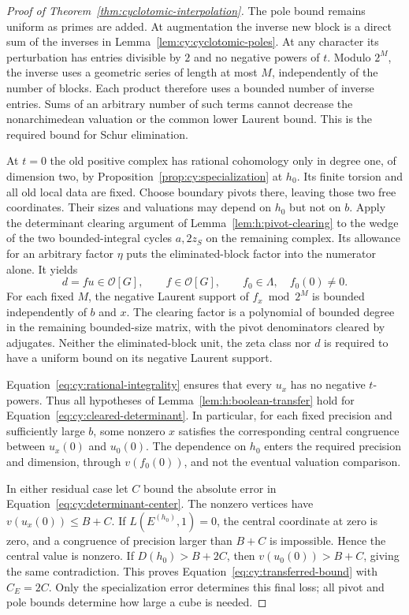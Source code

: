 \begin{proof}[Proof of Theorem~\ref{thm:cyclotomic-interpolation}]
The pole bound remains uniform as primes are added.  At augmentation the inverse new block is a direct
sum of the inverses in Lemma~\ref{lem:cy:cyclotomic-poles}.  At any
character its perturbation has entries divisible by $2$ and no
negative powers of $t$.  Modulo $2^M$, the inverse uses a geometric
series of length at most $M$, independently of the number of blocks.
Each product therefore uses a bounded number of inverse entries.
Sums of an arbitrary number of such terms cannot decrease the
nonarchimedean valuation or the common lower Laurent bound.  This is
the required bound for Schur elimination.

At $t=0$ the old positive complex has rational cohomology only in
degree one, of dimension two, by
Proposition~\ref{prop:cy:specialization} at $h_0$.  Its finite torsion
and all old local data are fixed.  Choose boundary pivots there,
leaving those two free coordinates.  Their sizes and valuations may
depend on $h_0$ but not on $b$.  Apply the determinant clearing argument
of Lemma~\ref{lem:h:pivot-clearing} to the wedge of the two
bounded-integral cycles $a,2z_S$ on the remaining complex. Its allowance
for an arbitrary factor $\eta$ puts the eliminated-block factor into
the numerator alone. It yields
\begin{equation}\label{eq:cy:cleared-determinant}
 d=fu\in\mathcal O[G],\qquad f\in\mathcal O[G],\qquad
 f_0\in\Lambda,\quad f_0(0)\ne0.
\end{equation}
For each fixed $M$, the negative Laurent support of $f_x\bmod2^M$
is bounded independently of $b$ and $x$.  The clearing factor is a
polynomial of bounded degree in the remaining bounded-size matrix,
with the pivot denominators cleared by adjugates. Neither the
eliminated-block unit, the zeta class nor $d$ is required to have a uniform bound on
its negative Laurent support.

Equation~\eqref{eq:cy:rational-integrality} ensures that every $u_x$
has no negative $t$-powers.  Thus all hypotheses of
Lemma~\ref{lem:h:boolean-transfer} hold for
Equation~\eqref{eq:cy:cleared-determinant}.  In particular, for each
fixed precision and sufficiently large $b$, some nonzero $x$ satisfies
the corresponding central congruence between $u_x(0)$ and $u_0(0)$.
The dependence on $h_0$ enters the required precision and dimension,
through $v(f_0(0))$, and not the eventual valuation comparison.

In either residual case let $C$ bound the absolute error in
Equation~\eqref{eq:cy:determinant-center}.  The nonzero vertices have
$v(u_x(0))\le B+C$.  If $L(E^{(h_0)},1)=0$, the central coordinate at
zero is zero, and a congruence of precision larger than $B+C$ is
impossible.  Hence the central value is nonzero.  If
$D(h_0)>B+2C$, then
$v(u_0(0))>B+C$, giving the same contradiction.  This proves
Equation~\eqref{eq:cy:transferred-bound} with $C_E=2C$.
Only the specialization error determines this final loss; all pivot
and pole bounds determine how large a cube is needed.
\end{proof}
